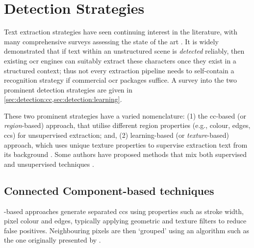 \section{Detection Strategies}
\label{sec:background:detection_strategies}

Text extraction strategies have seen continuing interest in the literature, with many comprehensive surveys assessing the state of the art \cite{Chen:2000ua, Jung:2004uwa, Zhang:2008vfa, Liang:2005uy, Jung:2004uw}. It is widely demonstrated that if text within an unstructured scene is \textit{detected} reliably, then existing \gls{ocr} engines can suitably extract these characters \citep{Smith:2007dc} once they exist in a structured context; thus not every extraction pipeline needs to self-contain a recognition strategy if commercial \gls{ocr} packages suffice. A survey into the two prominent detection strategies are given in \cref{sec:detection:cc,sec:detection:learning}.

These two prominent strategies have a varied nomenclature: (1) the \gls{cc}-based (or \textit{region}-based) approach, that utilise different region properties (e.g., colour, edges, \glspl{cc}) \citep{Jain:1998wd, Kim:1996tw, Liu:2006wh, Chen:2011ul, Li:2012wd, Zhang:2011cl, Shivakumara:2011dn, Epshtein:2010tj, Zhang:2010wa, Shivakumara:2010wu, Liu:2008tz, Subramanian:2007tf, Lee:2010vv, Sun:2010tg} for unsupervised extraction; and, (2) learning-based (or \textit{texture}-based) approach, which uses unique texture properties to supervise extraction text from its background \citep{Ye:2005wu,XiangrongChen:2004ha,Pan:2010cj,Gllavata:2004vq,Minetto:2010tg,Phan:2009bc,Lee:2003cn,Lienhart:2002ub,Li:2000uf,Wang:2009il,Dalal:2005jq,Hanif:2009tm,Tu:2003tg,Chen:2005wv}. Some authors have proposed methods that mix both supervised and unsupervised techniques \citep{Mutch:2006ub, Mairal:2008uw, Bengio:2006vb}.

\subsection{Connected Component-based techniques}
\label{sec:detection:cc}

-based approaches generate separated \glspl{cc} using properties such as stroke width, pixel colour and edges, typically applying geometric and texture filters to reduce false positives. Neighbouring pixels are then `grouped' using an algorithm such as the one originally presented by \citet{Horn:1986vc}. 

